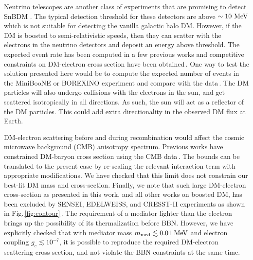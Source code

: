 \documentclass[prd,aps,twocolumn,tightenlines,notitlepage,nofootinbib,preprintnumbers,letterpaper,superscriptaddress]{revtex4-2}
\newcommand{\sbdm}{SnBDM }
\newcommand{\MeV}{{\rm\ MeV}}
\begin{document}
Neutrino telescopes are another class of experiments that are promising to detect \sbdm. The typical detection threshold for these detectors are above $\sim 10\MeV$ which is not suitable for detecting the vanilla galactic halo DM. However, if the DM is boosted to semi-relativistic speeds, then they can scatter with the electrons in the neutrino detectors and deposit an energy above threshold. The expected event rate has been computed in a few previous works and competitive constraints on DM-electron cross section have been obtained\,\cite{Bringmann:2018cvk}. One way to test the solution presented here would be to compute the expected number of events in the MiniBooNE or BOREXINO experiment and compare with the data\,\cite{Aguilar_Arevalo_2018,Aguilar-Arevalo:2017mqx,Bellini_2014}. The DM particles will also undergo collisions with the electrons in the sun, and  get scattered isotropically in all directions. As such, the sun will act as a reflector of the DM particles. This could add extra directionality in the observed DM flux at Earth.

DM-electron scattering before and during recombination would affect the cosmic microwave background (CMB) anisotropy spectrum. Previous works have constrained DM-baryon cross section using the CMB data\,\cite{Gluscevic_2018,Xu_2018}. The bounds can be translated to the present case by re-scaling the relevant interaction term with appropriate modifications. We have checked that this limit does not constrain our best-fit DM mass and cross-section. Finally, we note that such large DM-electron cross-section as presented in this work, and all other works on boosted DM, has been excluded by SENSEI, EDELWEISS, and CRESST-II experiments as shown in Fig.\,\ref{fig:contour}\,\cite{Barak:2020fql, Arnaud:2020svb, Abdelhameed:2019hmk}. 
The requirement of a mediator lighter than the electron brings up the possibility of its thermalization before BBN. However, we have explicitly checked that with mediator mass $m_{\rm med}\lesssim 0.01\MeV$ and electron coupling $g_e\lesssim 10^{-7}$, it is possible to reproduce the required DM-electron scattering cross section, and not violate the BBN constraints at the same time.
\end{document}
